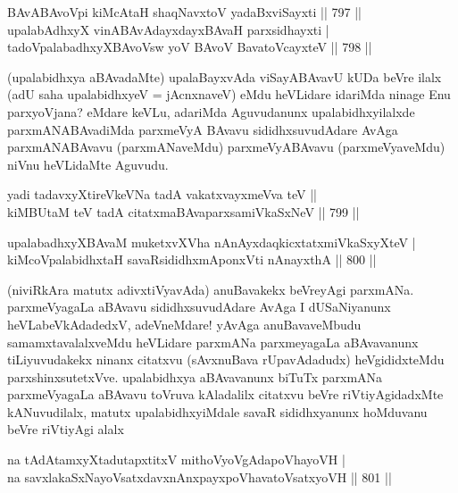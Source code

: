 \begin{shl}
BAvABAvoV\s pi kiMcAtaH shaqNavxtoV yadaBxviSayxti \hfill||  797 ||  \\
upalabAdhxyX vinA\s BAvAdayxdayxBAvaH parxsidhayxti | \\
tadoVpalabadhxyXBAvoV\s sw yoV BAvoV BavatoVcayxteV \hfill||  798 ||  
\end{shl}

\begin{artha}
(upalabidhxya aBAvadaMte) upalaBayxvAda viSayABAvavU kUDa beVre ilalx (adU saha upalabidhxyeV = jAcnxnaveV) eMdu heVLidare idariMda ninage Enu parxyoVjana? eMdare keVLu, adariMda Aguvudanunx upalabidhxyilalxde parxmANABAvadiMda parxmeVyA BAvavu sididhxsuvudAdare AvAga parxmANABAvavu (parxmANaveMdu) parxmeVyABAvavu (parxmeVyaveMdu) niVnu heVLidaMte Aguvudu.
\end{artha}

\begin{shl}
yadi tadavxyXtireVkeVNa tadA vakatxvayxmeVva teV ||  \\
kiMBUtaM teV tadA citatxmaBAvaparxsamiVkaSxNeV \hfill ||  799 ||  
\end{shl}
				
\begin{shl}
upalabadhxyXBAvaM muketxvXVha nAnAyxdaqkicxtatxmiVkaSxyXteV | \\
kiMcoVpalabidhxtaH savaRsididhxmAponxVti nAnayxthA \hfill||  800 ||  
\end{shl}

\begin{artha}
(niviRkAra matutx adivxtiVyavAda) anuBavakekx beVreyAgi parxmANa. parxmeVyagaLa aBAvavu sididhxsuvudAdare AvAga I dUSaNiyanunx heVLabeVkAdadedxV, adeVneMdare! yAvAga anuBavaveMbudu samamxtavalalxveMdu heVLidare parxmANa parxmeyagaLa aBAvavanunx tiLiyuvudakekx ninanx citatxvu (sAvxnuBava rUpavAdadudx) heVgididxteMdu parxshinxsutetxVve. upalabidhxya aBAvavanunx biTuTx parxmANa parxmeVyagaLa aBAvavu toVruva kAladalilx citatxvu beVre riVtiyAgidadxMte kANuvudilalx, matutx upalabidhxyiMdale savaR sididhxyanunx hoMduvanu beVre riVtiyAgi alalx
\end{artha}


\begin{shl}
na tAdAtamxyXtadutapxtitxV mithoV\s yoVgAdapoVhayoVH | \\
na savxlakaSxNayoVsatxdavxnAnxpayxpoVhavatoVsatxyoVH \hfill||  801 ||  
\end{shl}

